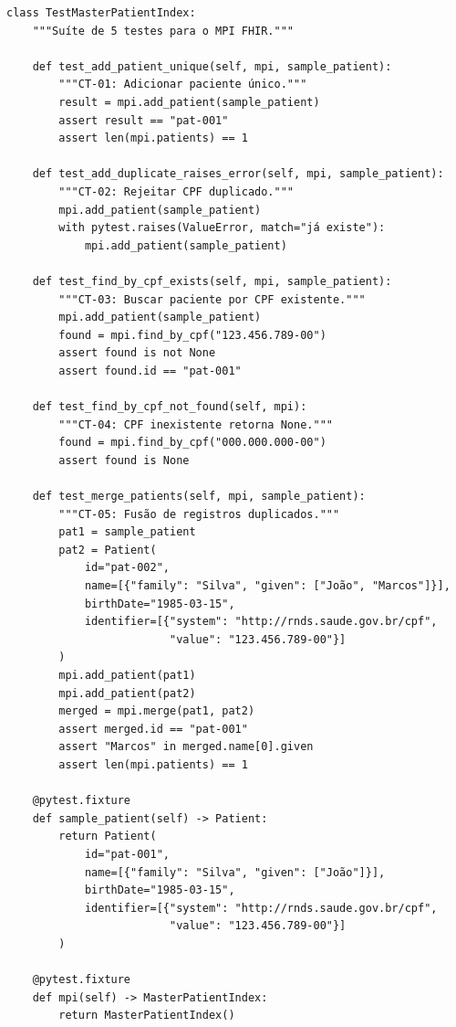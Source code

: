 \begin{lstlisting}[style=pythonstyle, caption=Suite de testes do MPI (test_mpi_completo.py), label=code:tdd_full]
class TestMasterPatientIndex:
    """Suíte de 5 testes para o MPI FHIR."""
    
    def test_add_patient_unique(self, mpi, sample_patient):
        """CT-01: Adicionar paciente único."""
        result = mpi.add_patient(sample_patient)
        assert result == "pat-001"
        assert len(mpi.patients) == 1
    
    def test_add_duplicate_raises_error(self, mpi, sample_patient):
        """CT-02: Rejeitar CPF duplicado."""
        mpi.add_patient(sample_patient)
        with pytest.raises(ValueError, match="já existe"):
            mpi.add_patient(sample_patient)
    
    def test_find_by_cpf_exists(self, mpi, sample_patient):
        """CT-03: Buscar paciente por CPF existente."""
        mpi.add_patient(sample_patient)
        found = mpi.find_by_cpf("123.456.789-00")
        assert found is not None
        assert found.id == "pat-001"
    
    def test_find_by_cpf_not_found(self, mpi):
        """CT-04: CPF inexistente retorna None."""
        found = mpi.find_by_cpf("000.000.000-00")
        assert found is None
    
    def test_merge_patients(self, mpi, sample_patient):
        """CT-05: Fusão de registros duplicados."""
        pat1 = sample_patient
        pat2 = Patient(
            id="pat-002",
            name=[{"family": "Silva", "given": ["João", "Marcos"]}],
            birthDate="1985-03-15",
            identifier=[{"system": "http://rnds.saude.gov.br/cpf",
                         "value": "123.456.789-00"}]
        )
        mpi.add_patient(pat1)
        mpi.add_patient(pat2)
        merged = mpi.merge(pat1, pat2)
        assert merged.id == "pat-001"
        assert "Marcos" in merged.name[0].given
        assert len(mpi.patients) == 1
    
    @pytest.fixture
    def sample_patient(self) -> Patient:
        return Patient(
            id="pat-001",
            name=[{"family": "Silva", "given": ["João"]}],
            birthDate="1985-03-15",
            identifier=[{"system": "http://rnds.saude.gov.br/cpf",
                         "value": "123.456.789-00"}]
        )
    
    @pytest.fixture
    def mpi(self) -> MasterPatientIndex:
        return MasterPatientIndex()
\end{lstlisting}

